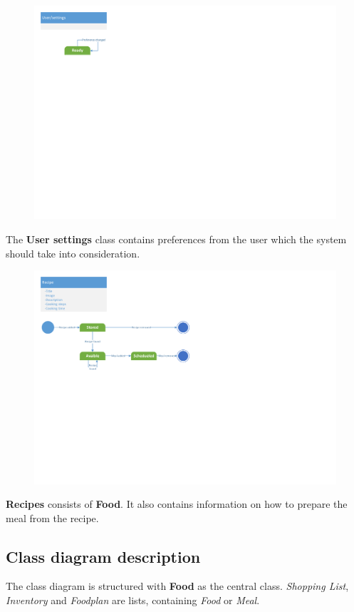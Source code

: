 \begin{figure}[H]
	\centering
	\includegraphics[width=1.0\textwidth]{Development/ProblemDomain/UserSettingsClass.pdf}
	\label{UserSettingsClass}
\end{figure}
The \textbf{User settings} class contains preferences from the user which the system should take into consideration.

\begin{figure}[H]
	\centering
	\includegraphics[width=1.0\textwidth]{Development/ProblemDomain/RecipeClass.pdf}
	\label{RecipeClass}
	\end{figure}
\textbf{Recipes} consists of \textbf{Food}. It also contains information on how to prepare the meal from the recipe.

\subsection{Class diagram description}
The class diagram is structured with \textbf{Food} as the central class. 
\textit{Shopping List}, \textit{Inventory} and \textit{Foodplan} are lists, containing \textit{Food} or \textit{Meal}.


